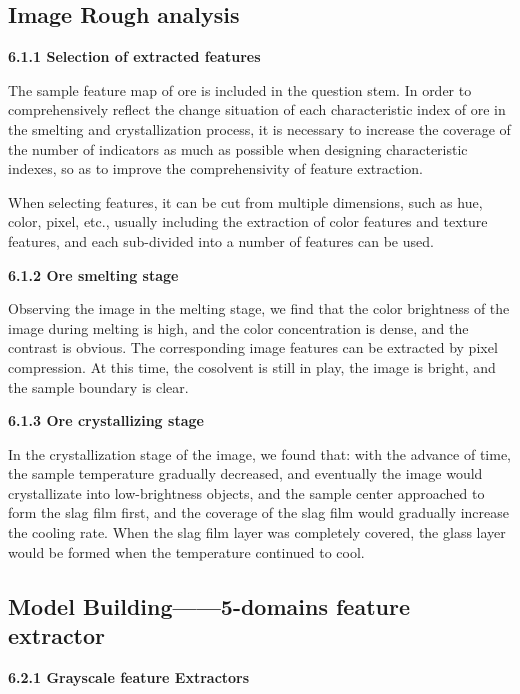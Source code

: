 \documentclass{apmcmthesis}
\begin{document}
	\subsection{Image Rough analysis}
		\noindent\textbf{6.1.1 Selection of extracted features}
		
		The sample feature map of ore is included in the question stem. In order to comprehensively reflect the change situation of each characteristic index of ore in the smelting and crystallization process, it is necessary to increase the coverage of the number of indicators as much as possible when designing characteristic indexes, so as to improve the comprehensivity of feature extraction.
		
		When selecting features, it can be cut from multiple dimensions, such as hue, color, pixel, etc., usually including the extraction of color features and texture features, and each sub-divided into a number of features can be used.
		
		\noindent\textbf{6.1.2 Ore smelting stage}
		
		Observing the image in the melting stage, we find that the color brightness of the image during melting is high, and the color concentration is dense, and the contrast is obvious. The corresponding image features can be extracted by pixel compression. At this time, the cosolvent is still in play, the image is bright, and the sample boundary is clear.
		
		\noindent\textbf{6.1.3 Ore crystallizing stage}

	In the crystallization stage of the image, we found that: with the advance of time, the sample temperature gradually decreased, and eventually the image would crystallizate into low-brightness objects, and the sample center approached to form the slag film first, and the coverage of the slag film would gradually increase the cooling rate. When the slag film layer was completely covered, the glass layer would be formed when the temperature continued to cool.
	
	\subsection{Model Building——5-domains feature extractor}
	\noindent\textbf{6.2.1 Grayscale feature Extractors}
	
\end{document}
